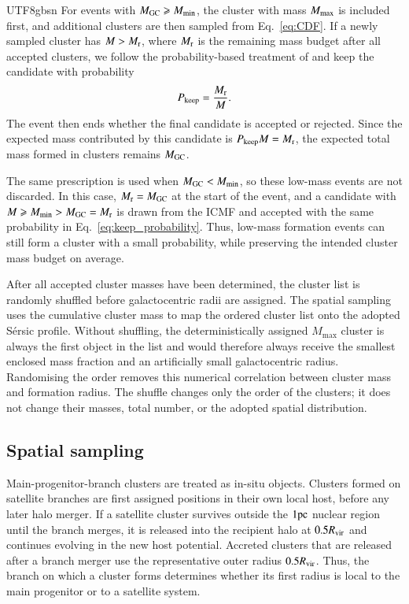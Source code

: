 \documentclass[trackchanges, twocolappendix, twocolumn]{aastex701}
\begin{document}
\begin{CJK*}{UTF8}{gbsn}
For events with $M_{\rm GC} \geqslant M_{\rm min}$, the cluster with mass $M_{\rm max}$ is included first, and additional clusters are then sampled from Eq.~\ref{eq:CDF}. If a newly sampled cluster has $M > M_{\rm r}$, where $M_{\rm r}$ is the remaining mass budget after all accepted clusters, we follow the probability-based treatment of \cite{Chen&Gnedin2023GC} and keep the candidate with probability
\begin{align}
P_{\rm keep} = \dfrac{M_{\rm r}}{M} .
\label{eq:keep_probability}
\end{align}
The event then ends whether the final candidate is accepted or rejected. Since the expected mass contributed by this candidate is $P_{\rm keep} M = M_{\rm r}$, the expected total mass formed in clusters remains $M_{\rm GC}$.

The same prescription is used when $M_{\rm GC} < M_{\rm min}$, so these low-mass events are not discarded. In this case, $M_{\rm r} = M_{\rm GC}$ at the start of the event, and a candidate with $M \geqslant M_{\rm min} > M_{\rm GC} = M_{\rm r}$ is drawn from the ICMF and accepted with the same probability in Eq.~\ref{eq:keep_probability}. Thus, low-mass formation events can still form a cluster with a small probability, while preserving the intended cluster mass budget on average.

After all accepted cluster masses have been determined, the cluster list is randomly shuffled before galactocentric radii are assigned. The spatial sampling uses the cumulative cluster mass to map the ordered cluster list onto the adopted S{\'e}rsic profile. Without shuffling, the deterministically assigned $M_{\max}$ cluster is always the first object in the list and would therefore always receive the smallest enclosed mass fraction and an artificially small galactocentric radius. Randomising the order removes this numerical correlation between cluster mass and formation radius. The shuffle changes only the order of the clusters; it does not change their masses, total number, or the adopted spatial distribution.

\subsection{Spatial sampling}
\label{subsect:spatial_sampling}

Main-progenitor-branch clusters are treated as in-situ objects. Clusters formed on satellite branches are first assigned positions in their own local host, before any later halo merger. If a satellite cluster survives outside the $1 \rm pc$ nuclear region until the branch merges, it is released into the recipient halo at $0.5R_{\rm vir}$ and continues evolving in the new host potential. Accreted clusters that are released after a branch merger use the representative outer radius $0.5R_{\rm vir}$. Thus, the branch on which a cluster forms determines whether its first radius is local to the main progenitor or to a satellite system.


\end{CJK*}
\end{document}
